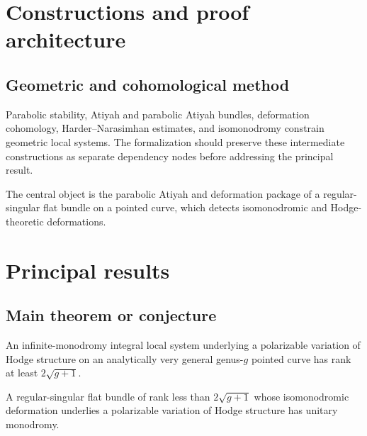 \chapter{Constructions and proof architecture}
\label{chap:geometric-local-systems-general-curves-isomonodromy-method}

\section{Geometric and cohomological method}
\label{sec:geometric-local-systems-general-curves-isomonodromy-method}

Parabolic stability, Atiyah and parabolic Atiyah bundles, deformation cohomology, Harder--Narasimhan estimates, and isomonodromy constrain geometric local systems. The formalization should preserve these intermediate constructions
as separate dependency nodes before addressing the principal result.

\begin{definition}
\label{geometric-local-systems-general-curves-isomonodromy-central-object}
The central object is the parabolic Atiyah and deformation package of a regular-singular flat bundle on a pointed curve, which detects isomonodromic and Hodge-theoretic deformations.
\notready
\end{definition}

\chapter{Principal results}
\label{chap:geometric-local-systems-general-curves-isomonodromy-results}

\section{Main theorem or conjecture}
\label{sec:geometric-local-systems-general-curves-isomonodromy-results}

\begin{theorem}
\label{geometric-local-systems-general-curves-isomonodromy-main}
An infinite-monodromy integral local system underlying a polarizable variation of Hodge structure on an analytically very general genus-$g$ pointed curve has rank at least $2\sqrt{g+1}$.
\notready
\end{theorem}

\begin{theorem}
\label{geometric-local-systems-general-curves-isomonodromy-secondary}
A regular-singular flat bundle of rank less than $2\sqrt{g+1}$ whose isomonodromic deformation underlies a polarizable variation of Hodge structure has unitary monodromy.
\notready
\end{theorem}
